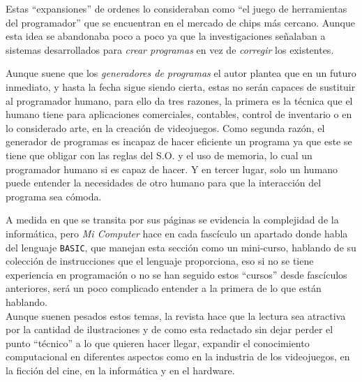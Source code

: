 \documentclass[12pt]{article}
\begin{document}
Estas ``expansiones'' de ordenes lo consideraban como ``el juego de herramientas
del programador'' que se encuentran en el mercado de chips más cercano. Aunque esta idea se abandonaba
poco a poco ya que la investigaciones señalaban a sistemas desarrollados para \textit{crear programas}
en vez de \textit{corregir} los existentes.

Aunque suene que los \textit{generadores de programas} el autor plantea que en un futuro inmediato,
y hasta la fecha sigue siendo cierta, estas no serán capaces de sustituir al programador humano, para
ello da tres razones, la primera es la técnica que el humano tiene para aplicaciones comerciales, contables,
control de inventario o en lo considerado arte, en la creación de videojuegos. Como segunda razón, el
generador de programas es incapaz de hacer eficiente un programa ya que este se tiene que obligar con
las reglas del S.O. y el uso de memoria, lo cual un programador humano si es capaz de hacer. Y en tercer lugar,
solo un humano puede entender la necesidades de otro humano para que la interacción del programa sea
cómoda.

A medida en que se transita por sus páginas se evidencia la complejidad de la informática, pero
\textit{Mi Computer} hace en cada fascículo un apartado donde habla del lenguaje \texttt{BASIC}, que manejan
esta sección como un mini-curso, hablando de su colección de instrucciones que el lenguaje proporciona,
eso si no se tiene experiencia en programación o no se han seguido estos ``cursos'' desde fascículos
anteriores, será un poco complicado entender a la primera de lo que están hablando.\\

Aunque suenen pesados estos temas, la revista hace que la lectura sea atractiva por la cantidad de
ilustraciones y de como esta redactado sin dejar perder el punto ``técnico'' a lo que quieren hacer
llegar, expandir el conocimiento computacional en diferentes aspectos como en la industria de los videojuegos,
en la ficción del cine, en la informática y en el hardware.




\end{document}
